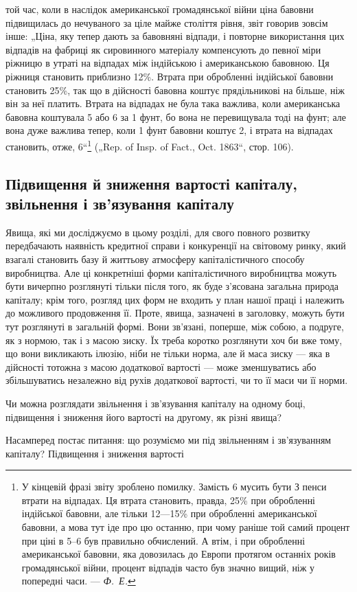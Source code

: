 \parcont{}  %
той час, коли в наслідок американської громадянської війни ціна
бавовни підвищилась до нечуваного за ціле майже століття
рівня, звіт говорив зовсім інше: „Ціна, яку тепер дають за бавовняні
відпади, і повторне використання цих відпадів на
фабриці як сировинного матеріалу компенсують до певної міри
ріжницю в утраті на відпадах між індійською і американською
бавовною. Ця ріжниця становить приблизно 12\%. Втрата при
обробленні індійської бавовни становить 25\%, так що в дійсності
бавовна коштує прядільникові на  більше, ніж він за неї
платить. Втрата на відпадах не була така важлива, коли американська
бавовна коштувала 5 або 6 за 1 фунт, бо вона
не перевищувала тоді  на фунт; але вона дуже важлива
тепер, коли 1 фунт бавовни коштує 2, і втрата на відпадах
становить, отже, 6“\footnote{
У кінцевій фразі звіту зроблено помилку. Замість 6 мусить бути З
пенси втрати на відпадах. Ця втрата становить, правда, 25\% при обробленні
індійської бавовни, але тільки 12—15\% при обробленні американської бавовни,
а мова тут іде про цю останню, при чому раніше той самий процент при
ціні в 5--6 був правильно обчислений. А втім, і при обробленні американської
бавовни, яка довозилась до Европи протягом останніх років громадянської
війни, процент відпадів часто був значно вищий, ніж у попередні
часи. — \emph{Ф.~Е.}
} („Rep. of Insp. of Fact., Oct.
1863“, стор. 106).

\subsection{Підвищення й зниження вартості капіталу, звільнення
і зв’язування капіталу}

Явища, які ми досліджуємо в цьому розділі, для свого повного
розвитку передбачають наявність кредитної справи і конкуренції
на світовому ринку, який взагалі становить базу й життьову атмосферу
капіталістичного способу виробництва. Але ці конкретніші
форми капіталістичного виробництва можуть бути вичерпно розглянуті
тільки після того, як буде з’ясована загальна природа
капіталу; крім того, розгляд цих форм не входить у план нашої
праці і належить до можливого продовження її. Проте, явища,
зазначені в заголовку, можуть бути тут розглянуті в загальній
формі. Вони зв’язані, поперше, між собою, а подруге, як
з нормою, так і з масою зиску. Їх треба коротко розглянути
хоч би вже тому, що вони викликають ілюзію, ніби не тільки
норма, але й маса зиску — яка в дійсності тотожна з масою
додаткової вартості — може зменшуватись або збільшуватись
незалежно від рухів додаткової вартості, чи то її маси чи її
норми.

Чи можна розглядати звільнення і зв’язування капіталу на
одному боці, підвищення і зниження його вартості на другому,
як різні явища?

Насамперед постає питання: що розуміємо ми під звільненням
і зв’язуванням капіталу? Підвищення і зниження вартості
\parbreak{}  %
